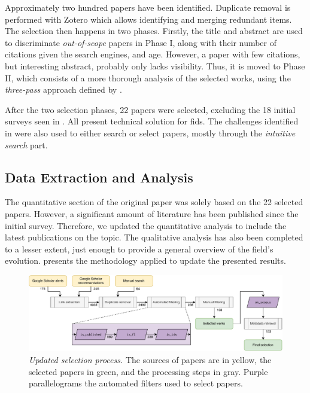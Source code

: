 Approximately two hundred papers have been identified.
Duplicate removal is performed with Zotero which allows identifying and merging redundant items.
The selection then happens in two phases.
Firstly, the title and abstract are used to discriminate \emph{out-of-scope} papers in Phase I, along with their number of citations given the search engines, and age.
However, a paper with few citations, but interesting abstract, probably only lacks visibility.
Thus, it is moved to Phase II, which consists of a more thorough analysis of the selected works, using the \emph{three-pass} approach defined by \textcite{keshav_Howreadpaper_2007}.

After the two selection phases, 22 papers were selected, excluding the 18 initial surveys seen in .
All present technical solution for \gls{fids}.
The challenges identified in  were also used to either search or select papers, mostly through the \emph{intuitive search} part.


\subsection{Data Extraction and Analysis\label{sec:sota.methodo.extraction}}

The quantitative section of the original paper was solely based on the 22 selected papers.
However, a significant amount of literature has been published since the initial survey.
Therefore, we updated the quantitative analysis to include the latest publications on the topic.
The qualitative analysis has also been completed to a lesser extent, just enough to provide a general overview of the field's evolution.
 presents the methodology applied to update the presented results.

\begin{figure}
\centering
  \includegraphics[width=\textwidth]{figures/update.drawio.pdf}
  \caption[
    Updated selection process.
  ]{
    \emph{Updated selection process.}
    The sources of papers are in yellow, the selected papers in green, and the processing steps in gray.
    Purple parallelograms the automated filters used to select papers.
    \label{fig:sota.methodo.update}
  }
\end{figure}

